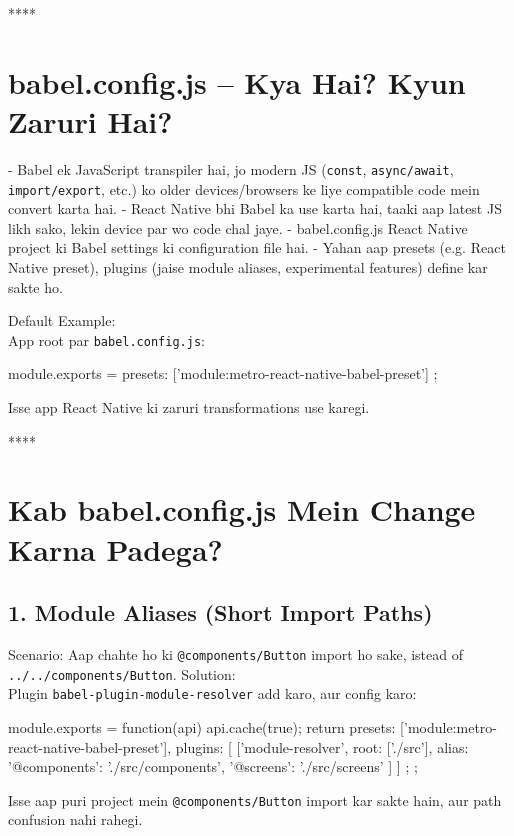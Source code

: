 \documentclass[a4paper]{article}
\newcommand\imp[1]{{\color{ImportantRed}#1}}
\begin{document}
{****
\section*{babel.config.js – Kya Hai? Kyun Zaruri Hai?}
- \imp{Babel} ek \imp{JavaScript transpiler} hai, jo modern JS (\texttt{const}, \texttt{async/await}, \texttt{import/export}, etc.) ko older devices/browsers ke liye compatible code mein convert karta hai.
- \imp{React Native} bhi Babel ka use karta hai, taaki aap latest JS likh sako, lekin device par wo code chal jaye.
- \imp{babel.config.js} React Native project ki \imp{Babel settings ki configuration file} hai.
- Yahan aap \imp{presets} (e.g. React Native preset), \imp{plugins} (jaise module aliases, experimental features) define kar sakte ho.

\imp{Default Example:}\\
App root par \texttt{babel.config.js}:

\begin{codeblock}
module.exports = {
  presets: ['module:metro-react-native-babel-preset']
};
\end{codeblock}

Isse app React Native ki zaruri transformations use karegi.

****
\section*{Kab babel.config.js Mein Change Karna Padega?}

\subsection*{1. Module Aliases (Short Import Paths)}
\imp{Scenario:} Aap chahte ho ki \texttt{@components/Button} import ho sake, istead of \texttt{../../components/Button}.
\imp{Solution:}\\
Plugin \texttt{babel-plugin-module-resolver} add karo, aur config karo:

\begin{codeblock}
module.exports = function(api) {
  api.cache(true);
  return {
    presets: ['module:metro-react-native-babel-preset'],
    plugins: [
      ['module-resolver', {
        root: ['./src'],
        alias: {
          '@components': './src/components',
          '@screens': './src/screens'
        }
      }]
    ]
  };
};
\end{codeblock}

Isse aap puri project mein \texttt{@components/Button} import kar sakte hain, aur path confusion nahi rahegi.

}
\end{document}
